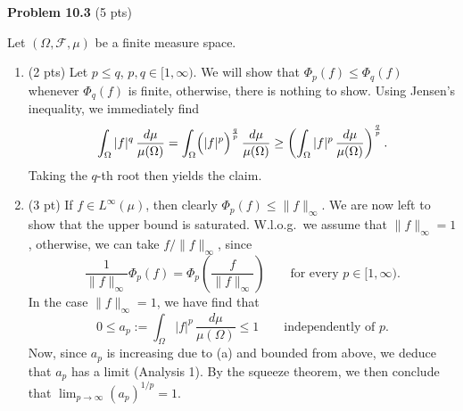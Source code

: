 \textbf{Problem 10.3} (5 pts)

Let $(\Omega,\mathcal{F},\mu)$ be a finite measure space.
\begin{enumerate}[label={(\alph*)}]
\item (2 pts) Let $p\le q$, $p,q\in[1,\infty)$. We will show that $\Phi_p(f)\le \Phi_q(f)$ whenever $\Phi_q(f)$ is finite, otherwise, there is nothing to show. Using Jensen's inequality, we immediately find
\[
	\int_\Omega |f|^q\,\frac{d\mu}{\mu(\Omega)} = \int_\Omega \Bigl(|f|^p\Bigr)^{\frac{q}{p}}\,\frac{d\mu}{\mu(\Omega)} \ge \left(\int_\Omega |f|^p\,\frac{d\mu}{\mu(\Omega)}\right)^{\frac{q}{p}}.
\]
Taking the $q$-th root then yields the claim. 

\item (3 pt) If $f\in L^\infty(\mu)$, then clearly $\Phi_p(f)\le \|f\|_\infty$. We are now left to show that the upper bound is saturated. W.l.o.g.\ we assume that $\|f\|_\infty=1$, otherwise, we can take $f/\|f\|_\infty$, since
\[
	\frac{1}{\|f\|_\infty}\Phi_p(f) = \Phi_p\left(\frac{f}{\|f\|_\infty}\right) \qquad\text{for every $p\in[1,\infty)$}.
\]
In the case $\|f\|_\infty=1$, we have find that
\[
	0\le a_p:=\int_\Omega |f|^p\,\frac{d\mu}{\mu(\Omega)} \le 1\qquad\text{independently of $p$}.
\]
Now, since $a_p$ is increasing due to (a) and bounded from above, we deduce that $a_p$ has a limit (Analysis 1). By the squeeze theorem, we then conclude that $\lim_{p\to\infty} (a_p)^{1/p} = 1$.

\end{enumerate}

\bigskip








